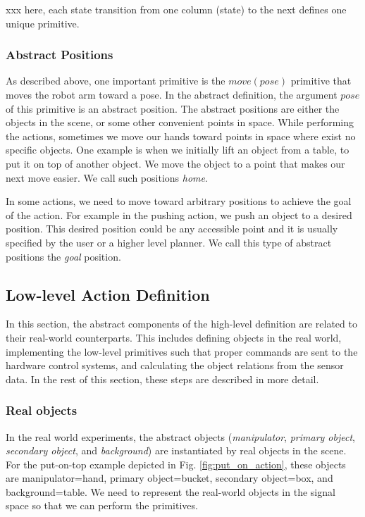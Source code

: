 xxx here, each state transition from one column (state) to the next defines one unique primitive.


\clearpage  %

\subsubsection{Abstract Positions}

As described above, one important primitive is the $move(pose)$ primitive that moves the robot arm toward a pose.
In the abstract definition, the argument $pose$ of this primitive is an abstract position.
The abstract positions are either the objects in the scene, or some other convenient points in space.
While performing the actions, sometimes we move our hands toward points in space where exist no specific objects.
One example is when we initially lift an object from a table, to put it on top of another object.
We move the object to a point that makes our next move easier.
We call such positions \textit{home}.

In some actions, we need to move toward arbitrary positions to achieve the goal of the action.
For example in the pushing action, we push an object to a desired position.
This desired position could be any accessible point and it is usually specified by the user or a higher level planner.
We call this type of abstract positions the \textit{goal} position.



\subsection{Low-level Action Definition}
\label{sec:low-level}
In this section, the abstract components of the high-level definition are related to their real-world counterparts.
This includes defining objects in the real world, implementing the low-level primitives such that proper commands are sent to the hardware control systems,
and calculating the object relations from the sensor data.
In the rest of this section, these steps are described in more detail.


\subsubsection{Real objects}
In the real world experiments, the abstract objects (\textit{manipulator}, \textit{primary object}, \textit{secondary object}, and \textit{background})
are instantiated by real objects in the scene.
For the put-on-top example depicted in Fig. \ref{fig:put_on_action},
these objects are manipulator=hand, primary object=bucket, secondary object=box, and background=table.
We need to represent the real-world objects in the signal space so that we can perform the primitives.

